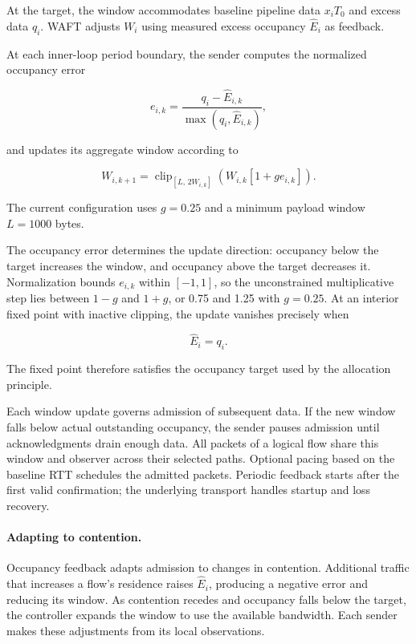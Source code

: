 At the target, the window accommodates baseline pipeline data \(x_iT_0\) and excess data \(q_i\). WAFT adjusts \(W_i\) using measured excess occupancy \(\widehat E_i\) as feedback.

At each inner-loop period boundary, the sender computes the normalized occupancy error

\begin{equation}
\label{eq:design-18}
e_{i,k}
=
\frac{q_i-\widehat E_{i,k}}
{\max(q_i,\widehat E_{i,k})},
\end{equation}

and updates its aggregate window according to

\begin{equation}
\label{eq:design-19}
\boxed{
W_{i,k+1}
=
\operatorname{clip}_{[L,\,2W_{i,k}]}
\left(
W_{i,k}[1+g e_{i,k}]
\right).
}
\end{equation}

The current configuration uses \(g=0.25\) and a minimum payload window \(L=1000\) bytes.

The occupancy error determines the update direction: occupancy below the target increases the window, and occupancy above the target decreases it. Normalization bounds \(e_{i,k}\) within \([-1,1]\), so the unconstrained multiplicative step lies between \(1-g\) and \(1+g\), or 0.75 and 1.25 with \(g=0.25\). At an interior fixed point with inactive clipping, the update vanishes precisely when

\begin{equation}
\label{eq:design-20}
\widehat E_i=q_i.
\end{equation}

The fixed point therefore satisfies the occupancy target used by the allocation principle.

Each window update governs admission of subsequent data. If the new window falls below actual outstanding occupancy, the sender pauses admission until acknowledgments drain enough data. All packets of a logical flow share this window and observer across their selected paths. Optional pacing based on the baseline RTT schedules the admitted packets. Periodic feedback starts after the first valid confirmation; the underlying transport handles startup and loss recovery.

\paragraph{Adapting to contention.}

Occupancy feedback adapts admission to changes in contention. Additional traffic that increases a flow's residence raises \(\widehat E_i\), producing a negative error and reducing its window. As contention recedes and occupancy falls below the target, the controller expands the window to use the available bandwidth. Each sender makes these adjustments from its local observations.

